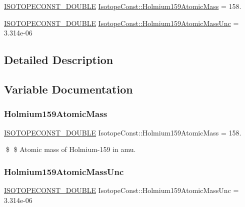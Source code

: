 \begin{DoxyCompactItemize}
\item 
\mbox{\hyperlink{group___isotope_const-_macros_ga8f45a7272ce02c0b4c65c44636ed719a}{I\+S\+O\+T\+O\+P\+E\+C\+O\+N\+S\+T\+\_\+\+D\+O\+U\+B\+LE}} \mbox{\hyperlink{group___isotope_const-_holmium-_ho159_ga81d6407169738964aeb6bef562d8cdd8}{Isotope\+Const\+::\+Holmium159\+Atomic\+Mass}} = 158.
\item 
\mbox{\hyperlink{group___isotope_const-_macros_ga8f45a7272ce02c0b4c65c44636ed719a}{I\+S\+O\+T\+O\+P\+E\+C\+O\+N\+S\+T\+\_\+\+D\+O\+U\+B\+LE}} \mbox{\hyperlink{group___isotope_const-_holmium-_ho159_ga161d82be36060bdf9742070902ba1f4c}{Isotope\+Const\+::\+Holmium159\+Atomic\+Mass\+Unc}} = 3.\+314e-\/06
\end{DoxyCompactItemize}


\subsection{Detailed Description}


\subsection{Variable Documentation}
\mbox{\label{group___isotope_const-_holmium-_ho159_ga81d6407169738964aeb6bef562d8cdd8}} 
\subsubsection{\texorpdfstring{Holmium159\+Atomic\+Mass}{Holmium159AtomicMass}}
{\footnotesize\ttfamily \mbox{\hyperlink{group___isotope_const-_macros_ga8f45a7272ce02c0b4c65c44636ed719a}{I\+S\+O\+T\+O\+P\+E\+C\+O\+N\+S\+T\+\_\+\+D\+O\+U\+B\+LE}} Isotope\+Const\+::\+Holmium159\+Atomic\+Mass = 158.}

\$ \$ Atomic mass of Holmium-\/159 in amu. \mbox{\label{group___isotope_const-_holmium-_ho159_ga161d82be36060bdf9742070902ba1f4c}} 
\subsubsection{\texorpdfstring{Holmium159\+Atomic\+Mass\+Unc}{Holmium159AtomicMassUnc}}
{\footnotesize\ttfamily \mbox{\hyperlink{group___isotope_const-_macros_ga8f45a7272ce02c0b4c65c44636ed719a}{I\+S\+O\+T\+O\+P\+E\+C\+O\+N\+S\+T\+\_\+\+D\+O\+U\+B\+LE}} Isotope\+Const\+::\+Holmium159\+Atomic\+Mass\+Unc = 3.\+314e-\/06}

